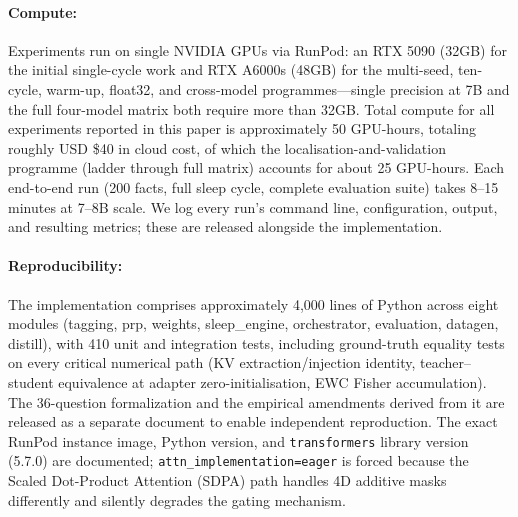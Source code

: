 \paragraph{Compute:}
Experiments run on single NVIDIA GPUs via RunPod: an RTX 5090 (32GB) for the initial single-cycle work and RTX A6000s (48GB) for the multi-seed, ten-cycle, warm-up, float32, and cross-model programmes---single precision at 7B and the full four-model matrix both require more than 32GB. Total compute for all experiments reported in this paper is approximately 50 GPU-hours, totaling roughly USD \$40 in cloud cost, of which the localisation-and-validation programme (ladder through full matrix) accounts for about 25 GPU-hours. Each end-to-end run (200 facts, full sleep cycle, complete evaluation suite) takes 8--15 minutes at 7--8B scale. We log every run's command line, configuration, output, and resulting metrics; these are released alongside the implementation.

\paragraph{Reproducibility:}
The implementation comprises approximately 4,000 lines of Python across eight modules (tagging, prp, weights, sleep\_engine, orchestrator, evaluation, datagen, distill), with 410 unit and integration tests, including ground-truth equality tests on every critical numerical path (KV extraction/injection identity, teacher--student equivalence at adapter zero-initialisation, EWC Fisher accumulation). The 36-question formalization and the empirical amendments derived from it are released as a separate document to enable independent reproduction. The exact RunPod instance image, Python version, and \texttt{transformers} library version (5.7.0) are documented; \texttt{attn\_implementation=eager} is forced because the Scaled Dot-Product Attention (SDPA) path handles 4D additive masks differently and silently degrades the gating mechanism.

